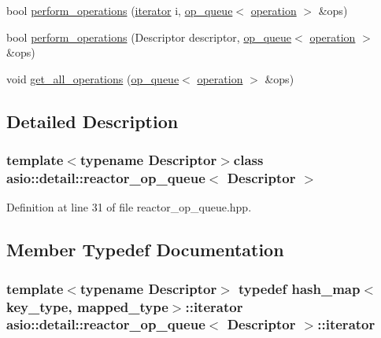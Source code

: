 \begin{DoxyCompactItemize}
\item 
bool \hyperlink{classasio_1_1detail_1_1reactor__op__queue_a64170834b88502024f5076dd4d11f83b}{perform\+\_\+operations} (\hyperlink{classasio_1_1detail_1_1reactor__op__queue_a3c73fd6c8576d3a1ad1eb4f320f2395a}{iterator} i, \hyperlink{classasio_1_1detail_1_1op__queue}{op\+\_\+queue}$<$ \hyperlink{namespaceasio_1_1detail_a338968609bec20e37145309f8f9ec936}{operation} $>$ \&ops)
\item 
bool \hyperlink{classasio_1_1detail_1_1reactor__op__queue_a0a02d85487bbf8c16a00f796441b42d6}{perform\+\_\+operations} (Descriptor descriptor, \hyperlink{classasio_1_1detail_1_1op__queue}{op\+\_\+queue}$<$ \hyperlink{namespaceasio_1_1detail_a338968609bec20e37145309f8f9ec936}{operation} $>$ \&ops)
\item 
void \hyperlink{classasio_1_1detail_1_1reactor__op__queue_a81362d777510d915313a0bc70bd22a0e}{get\+\_\+all\+\_\+operations} (\hyperlink{classasio_1_1detail_1_1op__queue}{op\+\_\+queue}$<$ \hyperlink{namespaceasio_1_1detail_a338968609bec20e37145309f8f9ec936}{operation} $>$ \&ops)
\end{DoxyCompactItemize}


\subsection{Detailed Description}
\subsubsection*{template$<$typename Descriptor$>$class asio\+::detail\+::reactor\+\_\+op\+\_\+queue$<$ Descriptor $>$}



Definition at line 31 of file reactor\+\_\+op\+\_\+queue.\+hpp.



\subsection{Member Typedef Documentation}
\hypertarget{classasio_1_1detail_1_1reactor__op__queue_a3c73fd6c8576d3a1ad1eb4f320f2395a}{}
\subsubsection[{iterator}]{\setlength{\rightskip}{0pt plus 5cm}template$<$typename Descriptor$>$ typedef {\bf hash\+\_\+map}$<${\bf key\+\_\+type}, {\bf mapped\+\_\+type}$>$\+::{\bf iterator} {\bf asio\+::detail\+::reactor\+\_\+op\+\_\+queue}$<$ Descriptor $>$\+::{\bf iterator}}\label{classasio_1_1detail_1_1reactor__op__queue_a3c73fd6c8576d3a1ad1eb4f320f2395a}


